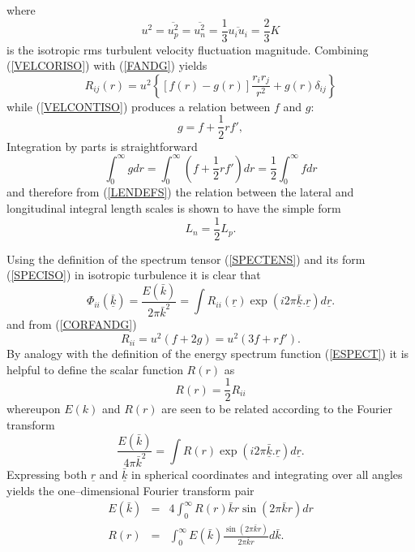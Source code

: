 \documentclass[dvips]{article}
\begin{document}
where
\begin{equation}
u^{2} = \overline{u_{p}^{2}} = \overline{u_{n}^{2}} =
\frac{1}{3}\overline{u_{i}u_{i}} = \frac{2}{3}K
\label{USQUARED}
\end{equation}
is the isotropic rms turbulent velocity fluctuation magnitude.
Combining (\ref{VELCORISO}) with (\ref{FANDG}) yields 
\begin{equation}
R_{ij}(r) = u^{2}\left\{\left[f(r)-g(r)\right]\frac{r_{i}r_{j}}{r^{2}}
 + g(r)\delta_{ij}\right\}
\label{CORFANDG}
\end{equation}
while (\ref{VELCONTISO}) produces a relation between $f$ and $g$:
\begin{equation}
g = f + \frac{1}{2} r f',
\label{GFROMF}
\end{equation} 
Integration by parts is straightforward
\[
\int_{0}^{\infty} g dr = \int_{0}^{\infty} \left( f + \frac{1}{2} r
f'\right) dr = \frac{1}{2} \int_{0}^{\infty} f dr
\]
and therefore from (\ref{LENDEFS}) the relation between the lateral and
longitudinal integral length scales is shown to have the simple form
\[
L_{n} = \frac{1}{2} L_{p}.
\]

Using the definition of the spectrum tensor (\ref{SPECTENS}) and its form
(\ref{SPECISO}) in isotropic turbulence it is clear that
\[
\Phi_{ii}(\underline{\bar{k}}) = \frac{E(\bar{k})}{2\pi \bar{k}^{2}}
= \int R_{ii}(\underline{r})
\exp{(i2\pi\underline{\bar{k}}.\underline{r})} d\underline{r}.
\]
and from (\ref{CORFANDG})
\begin{equation}
R_{ii} = u^{2}\left(f+2g\right) = u^{2}\left(3f+rf'\right).
\label{RII}
\end{equation}
By analogy with the definition of the energy spectrum function (\ref{ESPECT})
it is helpful to define the scalar function $R(r)$ as
\begin{equation}
R(r) = \frac{1}{2}R_{ii}
\label{RSCALAR}
\end{equation}
whereupon $E(k)$ and $R(r)$ are seen to be related according to the
Fourier transform
\[
\frac{E(\bar{k})}{4\pi \bar{k}^{2}}
= \int R(r)
\exp{(i2\pi\underline{\bar{k}}.\underline{r})} d\underline{r}.
\]
Expressing both $\underline{r}$ and $\underline{\bar{k}}$ in spherical
coordinates and integrating over all angles yields the
one--dimensional Fourier transform pair
\begin{eqnarray}
E(\bar{k}) & = & 4\int_{0}^{\infty} R(r) \bar{k}r \sin{(2\pi\bar{k}r)} dr
 \nonumber \\
R(r) & = & \int_{0}^{\infty} E(\bar{k})
\frac{\sin{(2\pi\bar{k}r)}}{2\pi\bar{k}r} d\bar{k}.
\label{RANDE}
\end{eqnarray}
\end{document}

